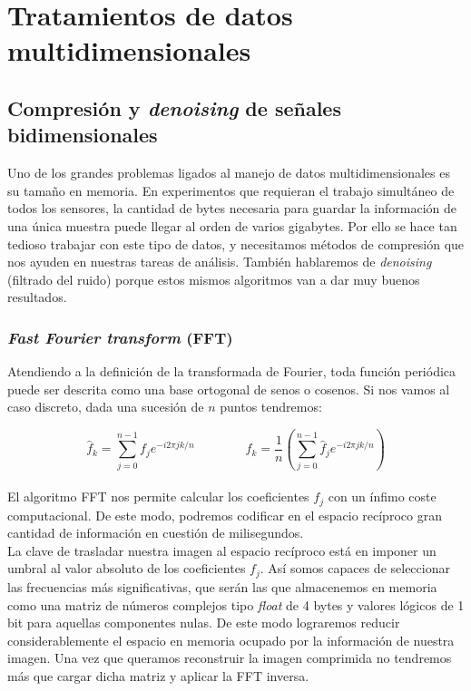 \section{Tratamientos de datos multidimensionales}

\subsection{Compresión y \textit{denoising} de señales bidimensionales}
Uno de los grandes problemas ligados al manejo de datos multidimensionales es su tamaño en memoria. En experimentos que requieran el trabajo simultáneo de todos los sensores, la cantidad de bytes necesaria para guardar la información de una única muestra puede llegar al orden de varios gigabytes. Por ello se hace tan tedioso trabajar con este tipo de datos, y necesitamos métodos de compresión que nos ayuden en nuestras tareas de análisis. También hablaremos de \textit{denoising} (filtrado del ruido) porque estos mismos algoritmos van a dar muy buenos resultados.

\subsubsection{\textit{Fast Fourier transform} (FFT)}
Atendiendo a la definición de la transformada de Fourier, toda función periódica puede ser descrita como una base ortogonal de senos o cosenos. Si nos vamos al caso discreto, dada una sucesión de $n$ puntos tendremos:

\begin{equation}
     \hat f_k = \sum^{n-1}_{j=0} f_j e^{-i2\pi j k/n}
     \qquad\qquad
     f_k = \frac{1}{n} \left( \sum^{n-1}_{j=0} \hat f_j e^{-i2\pi j k/n} \right)
\end{equation}\\

El algoritmo FFT nos permite calcular los coeficientes $f_j$ con un ínfimo coste computacional. De este modo, podremos codificar en el espacio recíproco gran cantidad de información en cuestión de milisegundos.\\

La clave de trasladar nuestra imagen al espacio recíproco está en imponer un umbral al valor absoluto de los coeficientes $f_j$. Así somos capaces de seleccionar las frecuencias más significativas, que serán las que almacenemos en memoria como una matriz de números complejos tipo \textit{float} de 4 bytes y valores lógicos de 1 bit para aquellas componentes nulas. De este modo lograremos reducir considerablemente el espacio en memoria ocupado por la información de nuestra imagen. Una vez que queramos reconstruir la imagen comprimida no tendremos más que cargar dicha matriz y aplicar la FFT inversa.\\

